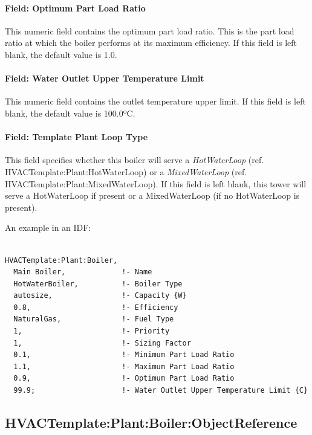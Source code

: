 \paragraph{Field: Optimum Part Load Ratio}\label{field-optimum-part-load-ratio-1-000}

This numeric field contains the optimum part load ratio. This is the part load ratio at which the boiler performs at its maximum efficiency. If this field is left blank, the default value is 1.0.

\paragraph{Field: Water Outlet Upper Temperature Limit}\label{field-water-outlet-upper-temperature-limit}

This numeric field contains the outlet temperature upper limit. If this field is left blank, the default value is 100.0ºC.

\paragraph{Field: Template Plant Loop Type}\label{field-template-plant-loop-type-2}

This field specifies whether this boiler will serve a \emph{HotWaterLoop} (ref. HVACTemplate:Plant:HotWaterLoop) or a \emph{MixedWaterLoop} (ref. HVACTemplate:Plant:MixedWaterLoop). If this field is left blank, this tower will serve a HotWaterLoop if present or a MixedWaterLoop (if no HotWaterLoop is present).

An example in an IDF:

\begin{lstlisting}

HVACTemplate:Plant:Boiler,
  Main Boiler,             !- Name
  HotWaterBoiler,          !- Boiler Type
  autosize,                !- Capacity {W}
  0.8,                     !- Efficiency
  NaturalGas,              !- Fuel Type
  1,                       !- Priority
  1,                       !- Sizing Factor
  0.1,                     !- Minimum Part Load Ratio
  1.1,                     !- Maximum Part Load Ratio
  0.9,                     !- Optimum Part Load Ratio
  99.9;                    !- Water Outlet Upper Temperature Limit {C}
\end{lstlisting}

\subsection{HVACTemplate:Plant:Boiler:ObjectReference}\label{hvactemplateplantboilerobjectreference}

